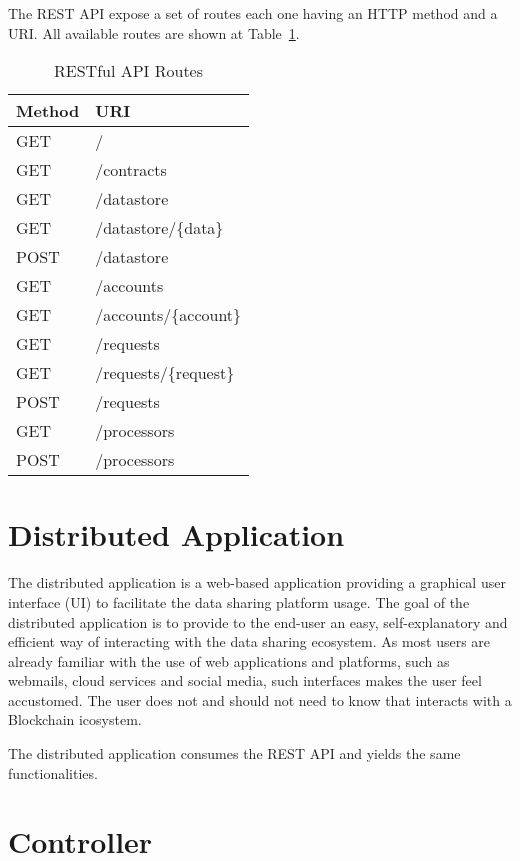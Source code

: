 The REST API expose a set of routes each one having an HTTP method and a URI. All available routes are shown at Table~\ref{table:api_routes}.

\begin{table}[ht!]
\centering
\begin{tabular}{|l|l|}
\hline
 Method & URI  \\ \hline
 GET & /\  \\ \hline
 GET &  /contracts \\ \hline
 GET &  /datastore \\ \hline
 GET &  /datastore/\{data\} \\ \hline
 POST &  /datastore\\ \hline
 GET &  /accounts \\ \hline
 GET &  /accounts/\{account\} \\ \hline
 GET &  /requests \\ \hline
 GET &  /requests/\{request\} \\ \hline
 POST &  /requests \\ \hline
 GET &  /processors \\ \hline
 POST &  /processors \\ \hline
\end{tabular}
\caption{RESTful API Routes}
\label{table:api_routes}
\end{table}

\section{Distributed Application}
\label{implemenation:dapp}

The distributed application is a web-based application providing a graphical user interface (UI) to facilitate the data sharing platform usage. The goal of the distributed application is to provide to the end-user an easy, self-explanatory and efficient way of interacting with the data sharing ecosystem. As most users are already familiar with the use of web applications and platforms, such as webmails, cloud services and social media, such interfaces makes the user feel accustomed. The user does not and should not need to know that interacts with a Blockchain icosystem.

The distributed application consumes the REST API and yields the same functionalities.

\section{Controller}
\label{implemenation:controller}

